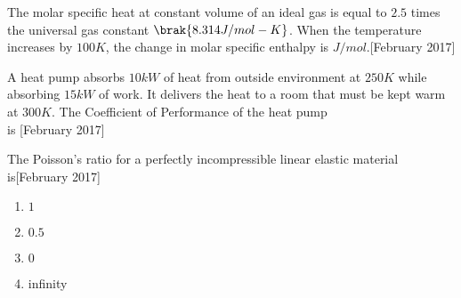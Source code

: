 \item The molar specific heat at constant volume of an ideal gas is equal to $2.5$ times the universal gas constant $\brak{8.314 J/mol-K}$. When the temperature increases by $100 K$, the change in molar specific enthalpy is \underline{\hspace{2cm}} $J/mol$.\hfill[February 2017]
\item A heat pump absorbs $10 kW$ of heat from outside environment at $250 K$ while absorbing $15 kW$ of work. It delivers the heat to a room that must be kept warm at $300 K$. The Coefficient of Performance   of the heat pump \\is \underline{\hspace{2cm}}\hfill[February 2017]
\item The Poisson's ratio for a perfectly incompressible linear elastic material \\is\hfill[February 2017]
\begin{enumerate}
    \item $1$
    \item $0.5$
    \item $0$
    \item infinity
\end{enumerate}

